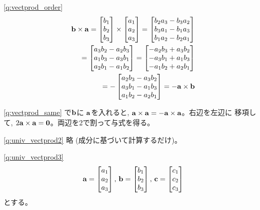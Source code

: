 \ref{q:vectprod_order} 
\begin{eqnarray*}
{\bf b}\times{\bf a}=
\begin{bmatrix}
b_1\\
b_2\\
b_3\\
\end{bmatrix}\times
\begin{bmatrix}
a_1\\
a_2\\
a_3\\
\end{bmatrix}=
\begin{bmatrix}
b_2a_3-b_3a_2\\
b_3a_1-b_1a_3\\
b_1a_2-b_2a_1\\
\end{bmatrix}\\
=
\begin{bmatrix}
a_3b_2-a_2b_3\\
a_1b_3-a_3b_1\\
a_2b_1-a_1b_2\\
\end{bmatrix}
=
\begin{bmatrix}
-a_2b_3+a_3b_2\\
-a_3b_1+a_1b_3\\
-a_1b_2+a_2b_1\\
\end{bmatrix}\\
=-
\begin{bmatrix}
a_2b_3-a_3b_2\\
a_3b_1-a_1b_3\\
a_1b_2-a_2b_1\\
\end{bmatrix}
=-{\bf a}\times{\bf b}
\end{eqnarray*}
\hv


\ref{q:vectprod_same} で${\bf b}$に
${\bf a}$を入れると, ${\bf a}\times{\bf a}=-{\bf a}\times{\bf a}$。右辺を左辺に
移項して, $2{\bf a}\times{\bf a}={\bf 0}$。両辺を2で割って与式を得る。\hv

%
\ref{q:univ_vectprod2}  略 (成分に基づいて計算するだけ)。
\hv

\ref{q:univ_vectprod3}
\begin{eqnarray*}
{\bf a}=
\begin{bmatrix}
a_1\\
a_2\\
a_3\\
\end{bmatrix}
,\,
{\bf b}=
\begin{bmatrix}
b_1\\
b_2\\
b_3\\
\end{bmatrix}
,\,
{\bf c}=
\begin{bmatrix}
c_1\\
c_2\\
c_3\\
\end{bmatrix}
\end{eqnarray*}
とする。

